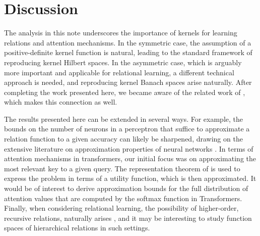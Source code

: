 \section{Discussion}

The analysis in this note underscores the importance of kernels for learning relations and attention mechanisms. In the symmetric case, the assumption of a positive-definite kernel function is natural, leading to the standard framework of reproducing kernel Hilbert spaces. In the asymmetric case, which is arguably more important and applicable for relational learning, a different technical approach is needed, and reproducing kernel Banach spaces arise naturally. After completing the work presented here, we became aware of the related work of \citet{wright2021transformers}, which makes this connection as well.

The results presented here can be extended in several ways. For example, the bounds on the 
number of neurons in a perceptron that suffice to approximate a relation function to a given accuracy can likely be sharpened, drawing on the extensive literature on approximation properties of neural networks \citep[e.g.,][]{petrushev1998approximation,pinkus1999approximation,makovoz1998uniform,burger2001error,maiorov2006approximation,bachBreakingCurseDimensionality2016}. In terms of attention mechanisms in transformers, our initial focus was on approximating the most relevant key to a given query. The representation theorem of \citet{debreuRepresentationPreferenceOrdering1954} is used to express the problem in terms of a utility function, which is then approximated. It would be of interest to derive approximation bounds for the full distribution of attention values that are computed by the softmax function in Transformers. Finally, when considering relational learning, the possibility of higher-order, recursive relations, naturally arises \citep[e.g.,][]{altabaaRelationalConvolutionalNetworks2023}, and it may be interesting to study function spaces of hierarchical relations in such settings.

